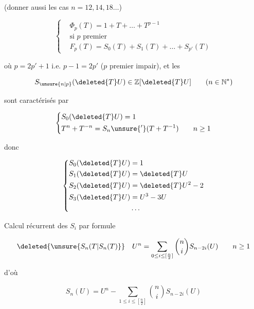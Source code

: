 (donner aussi les cas $n=12,14,18\ldots$)

\[
\left\{\begin{aligned}
&\Phi_p(T)=1+T+\ldots+T^{p-1}\\
&\text{si }p\text{ premier}\\
&F_p(T)=S_0(T)+S_1(T)+\ldots+S_{p'}(T)
\end{aligned}\right.
\]

où $p=2p'+1$ i.e. $p-1=2p'$ ($p$  premier impair), et les

\[
S_{\unsure{n|p}}(\deleted{T}U)\in\mathbb Z[\deleted{T}U]\qquad(n\in\mathbb N^*)
\]

sont caractérisés par

\[
\left\{\begin{aligned}
&S_0(\deleted{T}U)=1\\
&T^n+T^{-n}=S_n\unsure{'}(T+T^{-1})\qquad n\geq1
\end{aligned}\right.
\]

donc

\[
\left\{\begin{aligned}
S_0(\deleted{T}U)&=1\\
S_1(\deleted{T}U)&=\deleted{T}U\\
S_2(\deleted{T}U)&=\deleted{T}U^2-2\\
S_3(\deleted{T}U)&=U^3-3U\\
&\ldots
\end{aligned}\right.
\]

Calcul récurrent des $S_i$ par formule

\[
\deleted{\unsure{S_n(T|S_n(T)}}\quad U^n=\sum_{0\leq i\leq[\frac n2]}\binom ni S_{n-2i}(U)\qquad n\geq1
\]

d'où

\[
S_n(U)=U^n-\sum_{1\leq i\leq[\frac n2]}\binom ni S_{n-2i}(U)
\]

